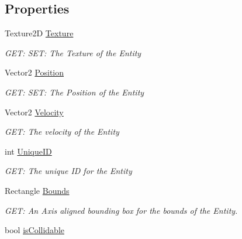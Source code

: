 \subsection*{Properties}
\begin{DoxyCompactItemize}
\item 
Texture2D \hyperlink{a00438_a57d9471e7a098f07743eb215f7e7d07c}{Texture}
\begin{DoxyCompactList}\small\item\em G\+ET\+: S\+ET\+: The Texture of the Entity \end{DoxyCompactList}\item 
Vector2 \hyperlink{a00438_a33bef4197ad7b1bf344ca31f0c1bed5b}{Position}
\begin{DoxyCompactList}\small\item\em G\+ET\+: S\+ET\+: The Position of the Entity \end{DoxyCompactList}\item 
Vector2 \hyperlink{a00438_a6569977576ff585b7a883f11fc073a6d}{Velocity}
\begin{DoxyCompactList}\small\item\em G\+ET\+: The velocity of the Entity \end{DoxyCompactList}\item 
int \hyperlink{a00438_af60396008872673e4a81baab29ad91b1}{Unique\+ID}
\begin{DoxyCompactList}\small\item\em G\+ET\+: The unique ID for the Entity \end{DoxyCompactList}\item 
Rectangle \hyperlink{a00438_a0c45df802f74c4910b8e7a0842cfbcd2}{Bounds}
\begin{DoxyCompactList}\small\item\em G\+ET\+: An Axis aligned bounding box for the bounds of the Entity. \end{DoxyCompactList}\item 
bool \hyperlink{a00438_a5f3ad8367eed3ba92165cea56d62eaf8}{is\+Collidable}

\end{DoxyCompactItemize}

